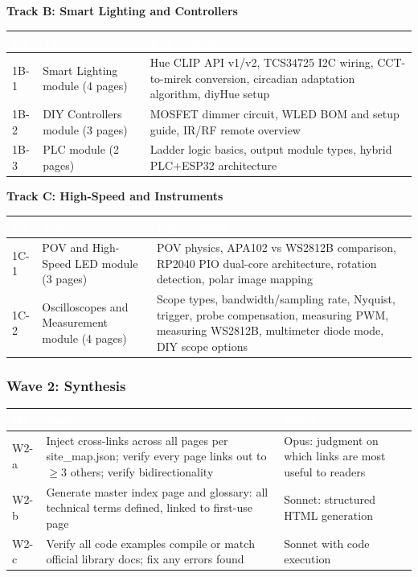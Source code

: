 \documentclass[11pt,letterpaper]{article}
\newcommand{\tableheader}[1]{\textbf{\sffamily\textcolor{white}{#1}}}
\begin{document}
\textbf{Track B: Smart Lighting and Controllers}

\begin{center}
\begin{tabularx}{\textwidth}{L{2cm}XL{3cm}}
\toprule
{}
\tableheader{ID} & \tableheader{Task} & \tableheader{Key Content} \\
\midrule
1B-1 & Smart Lighting module (4 pages) & Hue CLIP API v1/v2, TCS34725 I2C wiring, CCT-to-mirek conversion, circadian adaptation algorithm, diyHue setup \\
1B-2 & DIY Controllers module (3 pages) & MOSFET dimmer circuit, WLED BOM and setup guide, IR/RF remote overview \\
1B-3 & PLC module (2 pages) & Ladder logic basics, output module types, hybrid PLC+ESP32 architecture \\
\bottomrule
\end{tabularx}
\end{center}

\textbf{Track C: High-Speed and Instruments}

\begin{center}
\begin{tabularx}{\textwidth}{L{2cm}XL{3cm}}
\toprule
{}
\tableheader{ID} & \tableheader{Task} & \tableheader{Key Content} \\
\midrule
1C-1 & POV and High-Speed LED module (3 pages) & POV physics, APA102 vs WS2812B comparison, RP2040 PIO dual-core architecture, rotation detection, polar image mapping \\
1C-2 & Oscilloscopes and Measurement module (4 pages) & Scope types, bandwidth/sampling rate, Nyquist, trigger, probe compensation, measuring PWM, measuring WS2812B, multimeter diode mode, DIY scope options \\
\bottomrule
\end{tabularx}
\end{center}

\subsubsection{Wave 2: Synthesis}

\begin{center}
\begin{tabularx}{\textwidth}{L{2cm}XL{3cm}}
\toprule
{}
\tableheader{ID} & \tableheader{Task} & \tableheader{Notes} \\
\midrule
W2-a & Inject cross-links across all pages per site\_map.json; verify every page links out to $\geq 3$ others; verify bidirectionality & Opus: judgment on which links are most useful to readers \\
W2-b & Generate master index page and glossary: all technical terms defined, linked to first-use page & Sonnet: structured HTML generation \\
W2-c & Verify all code examples compile or match official library docs; fix any errors found & Sonnet with code execution \\
\bottomrule
\end{tabularx}
\end{center}
\end{document}
